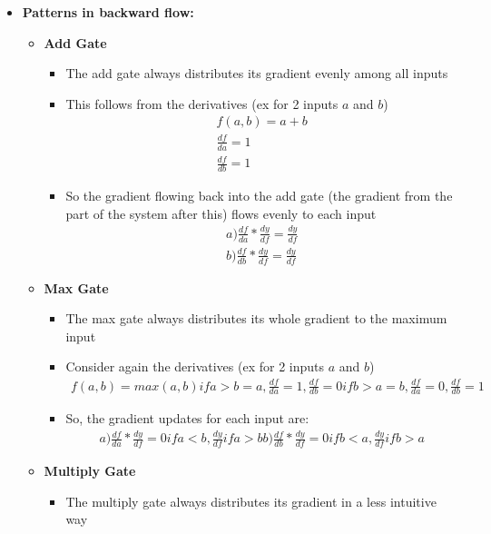 \documentclass[12pt]{article}
\begin{document}
\begin{itemize}
    \item \textbf{Patterns in backward flow:}
    \begin{itemize}
      \item \textbf{Add Gate}
      \begin{itemize}
        \item The add gate always distributes its gradient evenly among all inputs
        \item This follows from the derivatives (ex for 2 inputs $a$ and $b$)
        \begin{gather*}
          f(a,b) = a + b \\
          \frac{df}{da} = 1 \\
          \frac{df}{db} = 1
        \end{gather*}
        \item So the gradient flowing back into the add gate (the gradient from the part of the system after this) flows
        evenly to each input
        \begin{gather*}
          a) \frac{df}{da} * \frac{dy}{df} = \frac{dy}{df} \\
          b) \frac{df}{db} * \frac{dy}{df} = \frac{dy}{df}
        \end{gather*}
      \end{itemize}
      \item \textbf{Max Gate}
      \begin{itemize}
        \item The max gate always distributes its whole gradient to the maximum input
        \item Consider again the derivatives (ex for 2 inputs $a$ and $b$)
        \begin{gather*}
          f(a,b) = max(a,b)
          if a > b = a, \frac{df}{da} = 1, \frac{df}{db} = 0
          if b > a = b, \frac{df}{da} = 0, \frac{df}{db} = 1
        \end{gather*}
        \item So, the gradient updates for each input are:
        \begin{gather*}
          a) \frac{df}{da} * \frac{dy}{df} = 0 if a < b, \frac{dy}{df} if a > b
          b) \frac{df}{db} * \frac{dy}{df} = 0 if b < a, \frac{dy}{df} if b > a
        \end{gather*}
      \end{itemize}
      \item \textbf{Multiply Gate}
      \begin{itemize}
        \item The multiply gate always distributes its gradient in a less intuitive way

\end{itemize}
\end{itemize}
\end{itemize}
\end{document}
